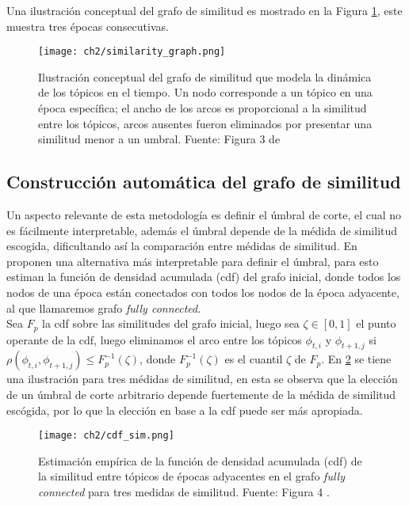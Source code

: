 \documentclass[letterpaper,12pt,oneside]{book} %
\begin{document}
Una ilustración conceptual del grafo de similitud es mostrado en la Figura \ref{img:graph}, este muestra tres épocas consecutivas.

\begin{figure}
    \centering
    \texttt{[image: ch2/similarity\_graph.png]}
    \caption{Ilustración conceptual del grafo de similitud que modela la dinámica de los tópicos en el tiempo. Un nodo corresponde a un tópico en una época específica; el ancho de los arcos es proporcional a la similitud entre los tópicos, arcos ausentes fueron eliminados por presentar una similitud menor a un umbral. Fuente:  Figura 3 de \citep{beykikhoshk2018discovering}}
    \label{img:graph}
\end{figure}

\subsection{Construcción automática del grafo de similitud}
\label{sec:automatic_construction}

Un aspecto relevante de esta metodología es definir el úmbral de corte, el cual no es fácilmente interpretable, además el úmbral depende de la médida de similitud escogida, dificultando así la comparación entre médidas de similitud. En \citep{beykikhoshk2018discovering} proponen una alternativa más interpretable para definir el úmbral, para esto estiman la función de densidad acumulada (cdf) del grafo inicial, donde todos los nodos de una época están conectados con todos los nodos de la época adyacente, al que llamaremos grafo \textit{fully connected}. \\

Sea $F_{p}$ la cdf sobre las similitudes del grafo inicial, luego sea $\zeta \in [0,1]$ el punto operante de la cdf, luego eliminamos el arco entre los tópicos $\phi_{t,i}$ y $\phi_{t+1,j}$ si $\rho(\phi_{t,i}, \phi_{t+1,j})\leq F_{p}^{-1}(\zeta)$, donde  $F_{p}^{-1}(\zeta)$ es el cuantil $\zeta$ de $F_{p}$. En \ref{img:cdf_sim} se tiene una ilustración para tres médidas de similitud, en esta se observa que la elección de un úmbral de corte arbitrario depende fuertemente de la médida de similitud escógida, por lo que la elección en base a la cdf puede ser más apropiada.

\begin{figure}
    \centering
    \texttt{[image: ch2/cdf\_sim.png]}
    \caption{Estimación empírica de la función de densidad acumulada (cdf) de la similitud entre tópicos de épocas adyacentes en el grafo \textit{fully connected} para tres medidas de similitud. Fuente: Figura 4 \citep{beykikhoshk2018discovering}.}
    \label{img:cdf_sim}
\end{figure}
\end{document}
